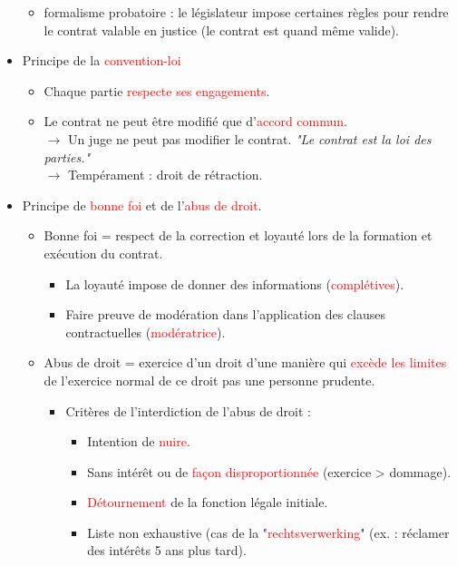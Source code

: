 \begin{itemize}
\begin{itemize}
		\item formalisme probatoire : le législateur impose certaines règles pour rendre le contrat valable en justice (le contrat est quand même valide).
	\end{itemize}
	\item Principe de la \textcolor{red}{convention-loi}
	\begin{itemize}
		\item Chaque partie \textcolor{red}{respecte ses engagements}.
		\item Le contrat ne peut être modifié que d'\textcolor{red}{accord commun}.\\
		$\rightarrow$ Un juge ne peut pas modifier le contrat. \textit{"Le contrat est la loi des parties."}\\
		$\rightarrow$ Tempérament : droit de rétraction.
	\end{itemize}
	\bigskip\medskip
	\item Principe de \textcolor{red}{bonne foi} et de l'\textcolor{red}{abus de droit}.
	\begin{itemize}
		\item Bonne foi = respect de la correction et loyauté lors de la formation et exécution du contrat.
		\begin{itemize}
			\item La loyauté impose de donner des informations (\textcolor{red}{complétives}).
			\item Faire preuve de modération dans l'application des clauses contractuelles (\textcolor{red}{modératrice}).
		\end{itemize}
		\item Abus de droit = exercice d'un droit d'une manière qui \textcolor{red}{excède les limites} de l'exercice normal de ce droit pas une personne prudente.
		\begin{itemize}
			\item Critères de l'interdiction de l'abus de droit :
			\begin{itemize}
				\item Intention de \textcolor{red}{nuire}.
				\item Sans intérêt ou de \textcolor{red}{façon disproportionnée} (exercice > dommage).
				\item \textcolor{red}{Détournement} de la fonction légale initiale.
				\item Liste non exhaustive (cas de la "\textcolor{red}{rechtsverwerking}" (ex. : réclamer des intérêts 5 ans plus tard).
			\end{itemize}

\end{itemize}
\end{itemize}
\end{itemize}
